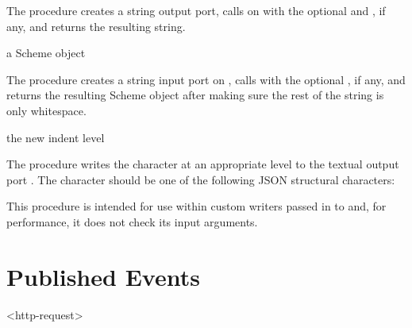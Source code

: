 The  procedure creates a string output port,
calls  on  with the optional  and
, if any, and returns the resulting string.

\begin{procedure}
\end{procedure}
\returns{} a Scheme object

The  procedure creates a string input port
on , calls  with the optional ,
if any, and returns the resulting Scheme object after making sure the rest
of the string is only whitespace.

\begin{procedure}
\end{procedure}
\returns{} the new indent level

The  procedure writes the character
 at an appropriate  level to the textual output
port . The character should be one of the following JSON
structural characters: \code{[ ] \{ \} : ,}

This procedure is intended for use within custom writers passed in to
 and, for performance, it does not check its input arguments.

\section {Published Events}

\begin{pubevent}{<http-request>}
\end{pubevent}
